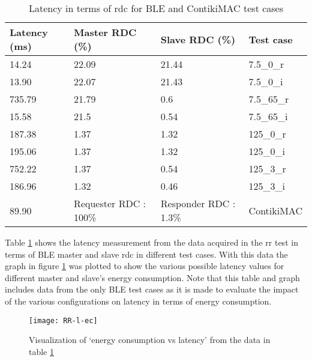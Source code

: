 \begin{table}[b]
\centering
\setlength{\extrarowheight}{1.5pt}
\begin{tabular}[c]{|l|l|l|l|}
\hline
Latency (ms) & Master RDC (\%) & Slave RDC (\%) & Test case \\ \hline
14.24 & 22.09 & 21.44 & 7.5\_0\_r \\ \hline
13.90 & 22.07 & 21.43 & 7.5\_0\_i \\ \hline
735.79 & 21.79 & 0.6 & 7.5\_65\_r \\ \hline
15.58 & 21.5 & 0.54 & 7.5\_65\_i \\ \hline
187.38 & 1.37 & 1.32 & 125\_0\_r \\ \hline
195.06 & 1.37 & 1.32 & 125\_0\_i \\ \hline
752.22 & 1.37 & 0.54 & 125\_3\_r \\ \hline
186.96 & 1.32 & 0.46 & 125\_3\_i \\ \hline  \hline
89.90 & Requester RDC : 100\% & Responder RDC : 1.3\% & ContikiMAC \\ \hline
\end{tabular}
\caption{Latency in terms of \gls{rdc} for BLE and ContikiMAC test cases}
\label{tbl:latVsEnergy}
\end{table}

Table \ref{tbl:latVsEnergy} shows the latency measurement from the data acquired in the \gls{rr} test in terms of BLE master and slave \gls{rdc} in different test cases. With this data the graph in figure \ref{fig:RR-l-ec} was plotted to show the various possible latency values for different master and slave's energy consumption. Note that this table and graph includes data from the only BLE test cases as it is made to evaluate the impact of the various configurations on latency in terms of energy consumption.

\begin{figure}[tb]
\texttt{[image: RR-l-ec]}
\caption{Visualization of `energy consumption vs
latency' from the data in table \ref{tbl:latVsEnergy}}
\label{fig:RR-l-ec}
\end{figure}

